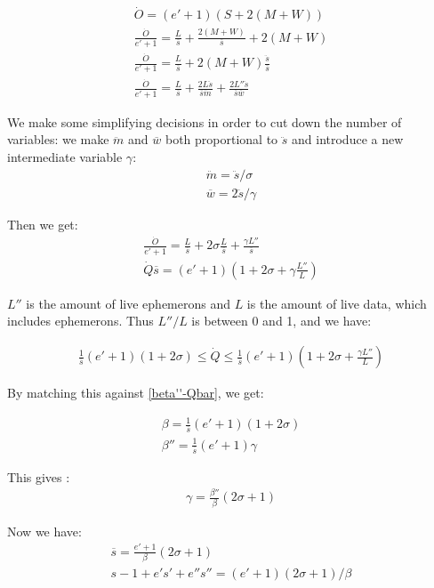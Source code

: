 \documentclass{article}
\begin{document}
\begin{gather}
\dot{O} = (e'+1)(S + 2(M+W)) \\
\frac{\dot{O}}{e'+1}
 = \frac{L}{\overline{s}} + \frac{2(M+W)}{\overline{s}} + 2(M+W) \\
\frac{\dot{O}}{e'+1}
 = \frac{L}{\overline{s}} + 2(M+W)\frac{\ddot{s}}{\overline{s}} \\
\frac{\dot{O}}{e'+1}
 = \frac{L}{\overline{s}} + \frac{2L\ddot{s}}{\overline{s}\ddot{m}}
     + \frac{2L''\ddot{s}}{\overline{s}\overline{w}}
\end{gather}

We make some simplifying decisions in order to cut down the number of
variables: we make $\ddot{m}$ and $\overline{w}$ both proportional to
$\ddot{s}$ and introduce a new intermediate variable $\gamma$:
\begin{gather}
\ddot{m} = \ddot{s} / \sigma \label{eqn-ms} \\
\overline{w} = 2\ddot{s} / \gamma \label{eqn-ws}
\end{gather}

Then we get:
\begin{gather}
\frac{\dot{O}}{e'+1}
 = \frac{L}{\overline{s}} + 2\sigma\frac{L}{\overline{s}}
     + \frac{\gamma L''}{\overline{s}} \\
\dot{Q}\overline{s} = (e'+1) (1 + 2\sigma + \gamma\frac{L''}{L})
\end{gather}

$L''$ is the amount of live ephemerons and $L$ is the amount of live
data, which includes ephemerons. Thus $L''/L$ is between 0 and 1, and
we have:

\begin{gather}
\frac{1}{\overline{s}}(e'+1)(1 + 2\sigma) \leq \dot{Q} \leq
\frac{1}{\overline{s}}(e'+1)(1 + 2\sigma + \frac{\gamma L''}{L})
\end{gather}

By matching this against \eqref{beta''-Qbar}, we get:

\begin{gather}
\beta = \frac{1}{\overline{s}}(e'+1)(1 + 2\sigma) \\
\beta'' = \frac{1}{\overline{s}}(e'+1)\gamma
\end{gather}

This gives :
\begin{gather}
\gamma = \frac{\beta''}{\beta}(2\sigma+1)
\end{gather}

Now we have:
\begin{gather}
\overline{s} = \frac{e'+1}{\beta}(2\sigma+1) \\
s - 1 + e's' + e''s'' = (e'+1)(2\sigma+1)/\beta
\end{gather}
\end{document}
